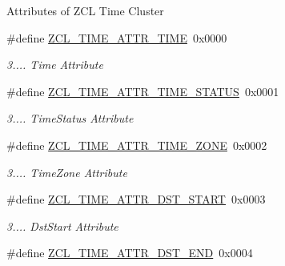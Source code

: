 Attributes of Z\+CL Time Cluster \begin{DoxyCompactItemize}
\item 
\mbox{\label{group__zcl__time_ga6abf0e2cc70ac533ebe153a40185be63}} 
\#define \hyperlink{group__zcl__time_ga6abf0e2cc70ac533ebe153a40185be63}{Z\+C\+L\+\_\+\+T\+I\+M\+E\+\_\+\+A\+T\+T\+R\+\_\+\+T\+I\+ME}~0x0000
\begin{DoxyCompactList}\small\item\em 3.... Time Attribute \end{DoxyCompactList}\item 
\mbox{\label{group__zcl__time_ga5931aa648c777cb21c8337249b6e1699}} 
\#define \hyperlink{group__zcl__time_ga5931aa648c777cb21c8337249b6e1699}{Z\+C\+L\+\_\+\+T\+I\+M\+E\+\_\+\+A\+T\+T\+R\+\_\+\+T\+I\+M\+E\+\_\+\+S\+T\+A\+T\+US}~0x0001
\begin{DoxyCompactList}\small\item\em 3.... Time\+Status Attribute \end{DoxyCompactList}\item 
\mbox{\label{group__zcl__time_ga28b3510bbe09eed7e47fe5b4f24c5bad}} 
\#define \hyperlink{group__zcl__time_ga28b3510bbe09eed7e47fe5b4f24c5bad}{Z\+C\+L\+\_\+\+T\+I\+M\+E\+\_\+\+A\+T\+T\+R\+\_\+\+T\+I\+M\+E\+\_\+\+Z\+O\+NE}~0x0002
\begin{DoxyCompactList}\small\item\em 3.... Time\+Zone Attribute \end{DoxyCompactList}\item 
\mbox{\label{group__zcl__time_gaaf1e36f36654ae9f4d1c453cdf9b526b}} 
\#define \hyperlink{group__zcl__time_gaaf1e36f36654ae9f4d1c453cdf9b526b}{Z\+C\+L\+\_\+\+T\+I\+M\+E\+\_\+\+A\+T\+T\+R\+\_\+\+D\+S\+T\+\_\+\+S\+T\+A\+RT}~0x0003
\begin{DoxyCompactList}\small\item\em 3.... Dst\+Start Attribute \end{DoxyCompactList}\item 
\mbox{\label{group__zcl__time_ga05ac335a9f642b671514517d8f4c4a16}} 
\#define \hyperlink{group__zcl__time_ga05ac335a9f642b671514517d8f4c4a16}{Z\+C\+L\+\_\+\+T\+I\+M\+E\+\_\+\+A\+T\+T\+R\+\_\+\+D\+S\+T\+\_\+\+E\+ND}~0x0004

\end{DoxyCompactItemize}
